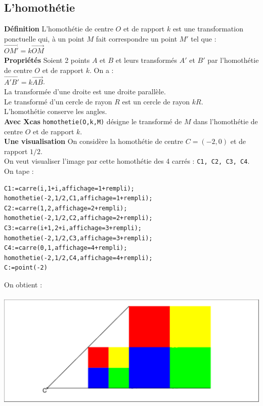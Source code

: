 \documentclass[a4paper,11pt]{book}
\begin{document}
\subsection{L'homoth\'etie}
{\bf D\'efinition}
L'homoth\'etie de centre $O$ et de rapport $k$ est une transformation 
ponctuelle qui, \`a un point $M$ fait correspondre un point $M'$ tel que :\\
$\overrightarrow{OM'}=k\overrightarrow{OM}$\\
{\bf Propri\'et\'es}
Soient 2 points $A$ et $B$ et leurs transform\'es $A'$ et $B'$ par 
l'homoth\'etie de centre $O$ et de rapport $k$.
On a :\\
$\overrightarrow{A'B'}=k\overrightarrow{AB}$.\\
La transform\'ee d'une droite est une droite parall\`ele.\\
Le transform\'e d'un cercle de rayon $R$ est un cercle de rayon $kR$.\\
L'homoth\'etie conserve les angles.\\
{\bf Avec Xcas}
{\tt homothetie(O,k,M)} d\'esigne le transform\'e
de $M$ dans l'homoth\'etie de centre $O$ et de rapport $k$.\\
{\bf Une visualisation}
On consid\`ere la homoth\'etie de centre $C=(-2,0)$ et de rapport $1/2$.\\
On veut visualiser l'image par cette homoth\'etie des 4 carr\'es :
{\tt C1, C2, C3, C4}.\\
On tape :
\begin{verbatim}
C1:=carre(i,1+i,affichage=1+rempli);
homothetie(-2,1/2,C1,affichage=1+rempli);
C2:=carre(1,2,affichage=2+rempli);
homothetie(-2,1/2,C2,affichage=2+rempli);
C3:=carre(i+1,2+i,affichage=3+rempli);
homothetie(-2,1/2,C3,affichage=3+rempli);
C4:=carre(0,1,affichage=4+rempli);
homothetie(-2,1/2,C4,affichage=4+rempli);
C:=point(-2)
\end{verbatim}
On obtient :\\
\ \\
\includegraphics[width=\textwidth]{damierhomo1}
\end{document}
